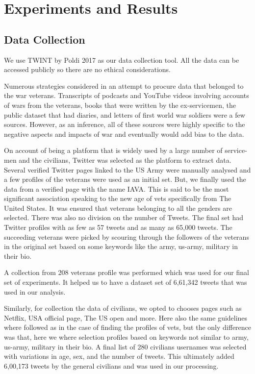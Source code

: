 \section{Experiments and Results}

\subsection{Data Collection}

We use TWINT by Poldi 2017 as our data collection tool. All the data can be accessed publicly so there are no ethical considerations.

Numerous strategies considered in an attempt to procure data that belonged to the war veterans. Transcripts of podcasts and YouTube videos involving accounts of wars from the veterans, books that were written by the ex-servicemen, the public dataset that had diaries, and letters of first world war soldiers were a few sources. However, as an inference, all of these sources were highly specific to the negative aspects and impacts of war and eventually would add bias to the data.

On account of being a platform that is widely used by a large number of service-men and the civilians, Twitter was selected as the platform to extract data. Several verified Twitter pages linked to the US Army were manually analysed and a few profiles of the veterans were used as an initial set. But, we finally used the data from a verified page with the name IAVA. This is said to be the most significant association speaking to the new age of vets specifically from The United States. It was ensured that veterans belonging to all the genders are selected. There was also no division on the number of Tweets. The final set had Twitter profiles with as few as 57 tweets and as many as 65,000 tweets. The succeeding veterans were picked by scouring through the followers of the veterans in the original set based on some keywords like the army, us-army, military in their bio.

A collection from 208 veterans profile was performed which was used for our final set of experiments. It helped us to have a dataset set of 6,61,342 tweets that was used in our analysis.

Similarly, for collection the data of civilians, we opted to chooses pages such as Netflix, USA official page, The US open and more. Here also the same guidelines where followed as in the case of finding the profiles of vets, but the only difference was that, here we where selection profiles based on keywords not similar to army, us-army, military in their bio. A final list of 280 civilians usernames was selected with variations in age, sex, and the number of tweets. This ultimately added 6,00,173 tweets by the general civilians and was used in our processing.

